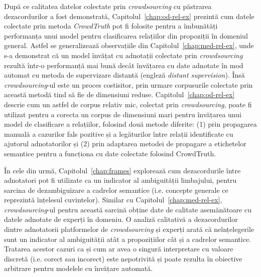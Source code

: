 După ce calitatea datelor colectate prin \textit{crowdsourcing} cu păstrarea dezacordurilor a fost demonstrată, Capitolul~\ref{chap:od-rel-ex} prezintă cum datele colectate prin metoda \textit{CrowdTruth} pot fi folosite pentru a îmbunătăți performanța unui model pentru clasificarea relațiilor din propoziții în domeniul general. Astfel se generalizează observațiile din Capitolul~\ref{chap:med-rel-ex}, unde s-a demonstrat că un model învățat cu adnotații colectate prin \textit{crowdsourcing} rezultă într-o performanță mai bună decât învățarea cu date adnotate în mod automat cu metoda de supervizare distantă (engleză \textit{distant supervision}). Însă \textit{crowdsourcing}-ul este un proces costisitor, prin urmare corpusurile colectate prin această metodă tind să fie de dimensiuni reduse. Capitolul~\ref{chap:od-rel-ex} descrie cum un astfel de corpus relativ mic, colectat prin \textit{crowdsourcing}, poate fi utilizat pentru a corecta un corpus de dimensiuni mari pentru învățarea unui model de clasificare a relațiilor, folosind două metode diferite: (1) prin propagarea manuală a cazurilor fals pozitive și a legăturilor între relații identificate cu ajutorul adnotatorilor și (2) prin adaptarea metodei de propagare a etichetelor semantice pentru a funcționa cu date colectate folosind CrowdTruth.

În cele din urmă, Capitolul~\ref{chap:frames} explorează cum dezacordurile între adnotatori pot fi utilizate ca un indicator al ambiguității limbajului, pentru sarcina de dezambiguizare a cadrelor semantice (i.e. concepte generale ce reprezintă înțelesul cuvintelor). Similar cu Capitolul~\ref{chap:med-rel-ex}, \textit{crowdsourcing}-ul pentru această sarcină obține date de calitate asemănătoare cu datele adnotate de experți în domeniu. O analiză calitativă a dezacordurilor dintre adnotatorii platformelor de \textit{crowdsourcing} și experți arată că neînțelegerile sunt un indicator al ambiguității atât a propozițiilor cât și a cadrelor semantice. Tratarea acestor cazuri ca și cum ar avea o singură interpretare cu valoare discretă (i.e. corect sau incorect) este nepotrivită și poate rezulta în obiective arbitrare pentru modelele cu învățare automată. 




